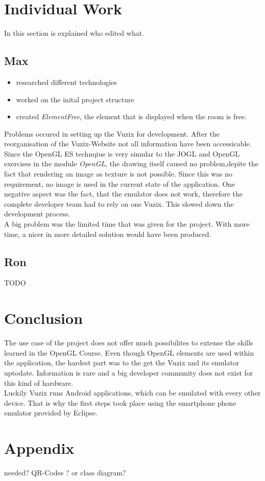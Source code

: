 \documentclass[11pt]{scrartcl}
\begin{document}
\begin{multicols}{2}
	\section{Individual Work}
		In this section is explained who edited what.
		\subsection{Max}
			\begin{itemize}
				\item researched different technologies
				\item worked on the inital project structure
				\item created \emph{ElementFree}, the element that is displayed when the room is free.
			\end{itemize}
			 Problems occured in setting up the Vuzix for development. After the reorganisation of the Vuzix-Website not all information have been accessicable. \\
			 Since the OpenGL ES technqiue is very simular to the JOGL and OpenGL exercises in the module \emph{OpenGL}, the drawing itself caused no problem,depite the fact that rendering an image as texture is not possible. Since this was no requirement, no image is used in the current state of the application.  One negative aspect was the fact, that the emulator does not work, therefore the complete developer team had to rely on one Vuzix. This slowed down the development process.\\
			 A big problem was the limited time that was given for the project.  With more time, a nicer in more detailed solution would have been produced.
		\subsection{Ron}
			TODO
			
	\section{Conclusion}
		The use case of the project does not offer much possibilites to extense the skills learned in the OpenGL Course. Even \linebreak though OpenGL elements are used within the application, the hardest part was to the get the Vuzix and its emulator uptodate. Information is rare and a big developer community does not exist for this kind of hardware. \\
		Luckily Vuzix runs Android applications, which can be emulated with every other device. That is why the first steps took place using the smartphone phone emulator provided by Eclipse. \\
\end{multicols}




\section*{Appendix}
needed? QR-Codes ? or class diagram?
\end{document}
